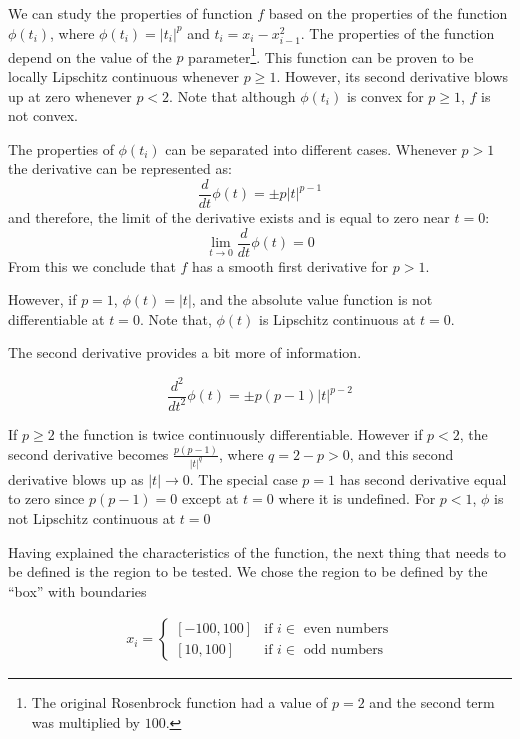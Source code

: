 We can study the properties of function $f$ based on the properties of the function $\phi(t_i)$, where $\phi(t_i) = |t_i|^p$ and $t_i = x_i - x_{i - 1}^2$. The properties of the function depend on the value of the $p$ parameter\footnote{The original Rosenbrock function had a value of $p = 2$ and the second term was multiplied by $100$.}. This function can be proven to be locally Lipschitz continuous whenever $p \geq 1$. However, its second derivative blows up at zero whenever $p < 2$. Note that although $\phi(t_i)$ is convex for $p \geq 1$, $f$ is not convex.

The properties of $\phi(t_i)$ can be separated into different cases. Whenever $p > 1$ the derivative can be represented as:
\begin{equation}\label{firstderiv}
  \frac{d}{dt} \phi(t) = \pm p |t|^{p-1}
\end{equation}
and therefore, the limit of the derivative exists and is equal to zero near $t = 0$: \[ \lim_{t \to 0} \frac{d}{dt}\phi(t) = 0 \] From this we conclude that $f$ has a smooth first derivative for $p > 1$.

However, if $p = 1$, $\phi(t) = |t|$, and the absolute value function is not differentiable at $t = 0$. Note that, $\phi(t)$ is Lipschitz continuous at $t = 0$.

The second derivative provides a bit more of information.

\begin{equation}\label{secondderiv}
  \frac{d^2}{dt^2} \phi(t) = \pm p(p-1) |t|^{p-2}
\end{equation}

If $p \geq 2$ the function is twice continuously differentiable. However if $p < 2$, the second derivative becomes $\frac{p(p-1)}{|t|^{q}}$, where $q = 2 - p > 0$, and this second derivative blows up as $|t| \to 0$. The special case $p = 1$ has second derivative equal to zero since $p(p-1) = 0$ except at $t = 0$ where it is undefined. For $p < 1$, $\phi$ is not Lipschitz continuous at $t = 0$

Having explained the characteristics of the function, the next thing that needs to be defined is the region to be tested. We chose the region to be defined by the ``box'' with boundaries

\begin{equation}
  \begin{aligned}
    x_i = 
    \begin{cases}
      [-100, 100] & \text{if } i \in \text{ even numbers} \\
      [10, 100] & \text{if } i \in \text{ odd numbers}
    \end{cases}
  \end{aligned}
\end{equation}


